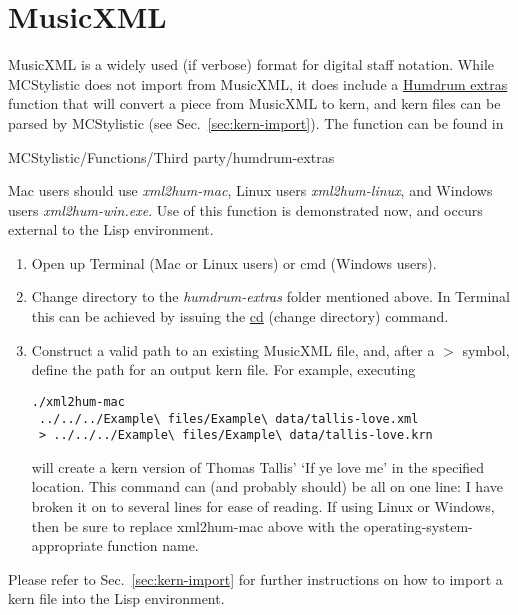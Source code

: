 \section{MusicXML}\label{sec:musicxml}

MusicXML is a widely used (if verbose) format for digital staff notation. While MCStylistic does not import from MusicXML, it does include a \href{http://extras.humdrum.org/}{Humdrum extras} function that will convert a piece from MusicXML to kern, and kern files can be parsed by MCStylistic (see Sec.~\ref{sec:kern-import}). The function can be found in

\vspace{.25cm}
\noindent MCStylistic/Functions/Third party/humdrum-extras
\vspace{.25cm}

Mac users should use \emph{xml2hum-mac}, Linux users \emph{xml2hum-linux}, and Windows users \emph{xml2hum-win.exe}. Use of this function is demonstrated now, and occurs external to the Lisp environment.

\begin{enumerate}
\item Open up Terminal (Mac or Linux users) or cmd (Windows users).
\item Change directory to the \emph{humdrum-extras} folder mentioned above. In Terminal this can be achieved by issuing the \href{http://en.wikipedia.org/wiki/Cd_\%28command\%29}{cd} (change directory) command.
\item Construct a valid path to an existing MusicXML file, and, after a $>$ symbol, define the path for an output kern file. For example, executing
\begin{verbatim}
./xml2hum-mac
 ../../../Example\ files/Example\ data/tallis-love.xml
 > ../../../Example\ files/Example\ data/tallis-love.krn
\end{verbatim}
will create a kern version of Thomas Tallis' `If ye love me' in the specified location. This command can (and probably should) be all on one line: I have broken it on to several lines for ease of reading. If using Linux or Windows, then be sure to replace xml2hum-mac above with the operating-system-appropriate function name.
\end{enumerate}

Please refer to Sec.~\ref{sec:kern-import} for further instructions on how to import a kern file into the Lisp environment. 


